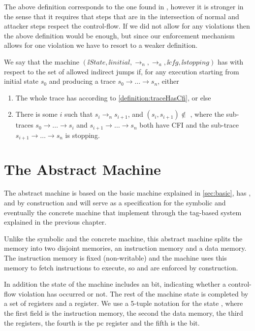 The above definition corresponds to the one found in \cite{abadi2005}, however
it is stronger in the sense that it requires that steps that are in the
intersection of normal and attacker steps respect the control-flow. If we did
not allow for any violations then the above definition would be enough, but
since our enforcement mechanism allows for one violation we have to resort to a
weaker definition.

\begin{definition}[CFI]\label{definition:CFI}
  We say that the machine
  $(\ii{State}, \ii{initial}, \to_n,\allowbreak \to_a, \ii{cfg}, \ii{stopping})$
  has \CFI with respect to the set of allowed indirect jumps \CFG
  if, for any execution starting from initial state $s_0$
  and producing a trace $s_0 \to \ldots \to s_n$, either
  \begin{enumerate}
  \item The whole trace has \CFI according to
    \autoref{definition:traceHasCfi}, or else
  \item There is some $i$ such that $s_i \to_n s_{i+1}$,
  and $(s_i, s_{i+1}) \not \in$ \SUCC, where
  the sub-traces $s_0 \to \ldots \to s_i$ and
  $s_{i+1} \to \ldots \to s_n$ both have CFI
  and the sub-trace $s_{i+1} \to \ldots \to s_n$ is stopping.
  \end{enumerate}
\end{definition}

\section{The Abstract Machine}\label{sec:abstract_cfi}

The abstract machine is based on the basic machine explained in \ref{sec:basic},
has \CFI, \NXD and \NWC by construction and will serve as a 
specification for the symbolic and eventually the concrete machine that
implement \CFI through the tag-based system explained in the previous chapter.

Unlike the symbolic and the concrete machine, this abstract machine splits the 
memory into two disjoint memories, an instruction memory and a data memory. The
instruction memory is fixed (non-writable) and the machine uses this memory to
fetch instructions to execute, so \NWC and \NXD are enforced by construction.

In addition the state of the machine includes an \ok bit, indicating 
whether a control-flow violation has occurred or not. The rest of the machine
state is completed by a set of registers and a \pc register. We use a 5-tuple
notation for the state \acfistat{\imem}{\dmem}{\reg}{\pc}{\ok}, where the first
field is the instruction memory, the second the data memory, the third the
registers, the fourth is the pc register and the fifth is the \ok bit.

